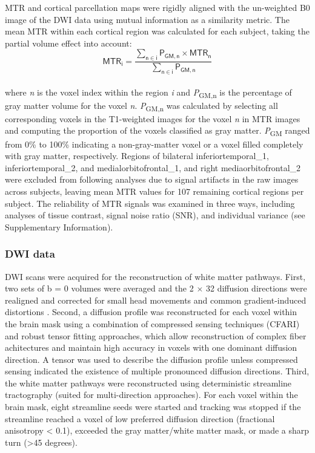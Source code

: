 \begin{refsection}
MTR and cortical parcellation maps were rigidly aligned with the un-weighted B0 image of the DWI data using mutual information as a similarity metric. The mean MTR within each cortical region was calculated for each subject, taking the partial volume effect into account:\\
\[ \mathsf{MTR_{i} = \frac{\sum_{n\in i} P_{GM,n} \times MTR_{n}}{\sum_{n\in i} P_{GM,n}} } \]\\
where \textit{n} is the voxel index within the region \textit{i} and \textit{P}\textsubscript{GM,n} is the percentage of gray matter volume for the voxel \textit{n}. \textit{P}\textsubscript{GM,n} was calculated by selecting all corresponding voxels in the T1-weighted images for the voxel \textit{n} in MTR images and computing the proportion of the voxels classified as gray matter. \textit{P}\textsubscript{GM} ranged from 0\% to 100\% indicating a non-gray-matter voxel or a voxel filled completely with gray matter, respectively. Regions of bilateral inferiortemporal\_1, inferiortemporal\_2, and medialorbitofrontal\_1, and right mediaorbitofrontal\_2 were excluded from following analyses due to signal artifacts in the raw images across subjects, leaving mean MTR values for 107 remaining cortical regions per subject. The reliability of MTR signals was examined in three ways, including analyses of tissue contrast, signal noise ratio (SNR), and individual variance (see Supplementary Information).

\subsubsection*{DWI data}
DWI scans were acquired for the reconstruction of white matter pathways. First, two sets of b = 0 volumes were averaged and the 2 $\times$ 32 diffusion directions were realigned and corrected for small head movements and common gradient-induced distortions \citep{ANDERSSON2002177}. Second, a diffusion profile was reconstructed for each voxel within the brain mask using a combination of compressed sensing techniques (CFARI) \citep{Landman2012ResolutionOC} and robust tensor fitting approaches, which allow reconstruction of complex fiber achitectures and maintain high accuracy in voxels with one dominant diffusion direction. A tensor was used to describe the diffusion profile unless compressed sensing indicated the existence of multiple pronounced diffusion directions. Third, the white matter pathways were reconstructed using deterministic streamline tractography (suited for multi-direction approaches). For each voxel within the brain mask, eight streamline seeds were started and tracking was stopped if the streamline reached a voxel of low preferred diffusion direction (fractional anisotropy < 0.1), exceeded the gray matter/white matter mask, or made a sharp turn (>45 degrees).


\end{refsection}
